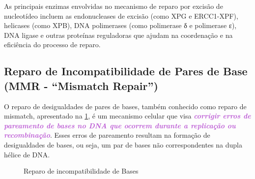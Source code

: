 \documentclass[11pt,a4paper]{article}
\begin{document}
	As principais enzimas envolvidas no mecanismo de reparo por excisão de nucleotídeo incluem as endonucleases de excisão (como XPG e ERCC1-XPF), helicases (como XPB), DNA polimerases (como polimerase δ e polimerase ε), DNA ligase e outras proteínas reguladoras que ajudam na coordenação e na eficiência do processo de reparo.

\subsection*{Reparo de Incompatibilidade de Pares de Base (MMR - ``Mismatch Repair'')}

	O reparo de desigualdades de pares de bases, também conhecido como reparo de mismatch, apresentado na \ref{fig:mismatchReparo}, é um mecanismo celular que visa \textcolor{MediumOrchid}{\textbf{\textit{corrigir erros de pareamento de bases no DNA que ocorrem durante a replicação ou recombinação}}}. Esses erros de pareamento resultam na formação de desigualdades de bases, ou seja, um par de bases não correspondentes na dupla hélice de DNA.

	\begin{figure}[h]
		\centering
		\caption{Reparo de incompatibilidade de Bases}
		\label{fig:mismatchReparo}
	\end{figure}
\end{document}
